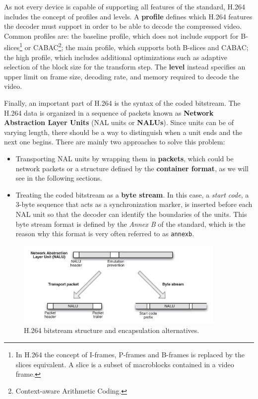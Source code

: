 As not every device is capable of supporting all features of the standard, H.264 includes the concept of profiles and levels. A \textbf{profile} defines which H.264 features the decoder must support in order to be able to decode the compressed video. Common profiles are: the baseline profile, which does not include support for B-slices\footnote{In H.264 the concept of I-frames, P-frames and B-frames is replaced by the slices equivalent. A slice is a subset of macroblocks contained in a video frame.} or CABAC\footnote{Context-aware Arithmetic Coding.}; the main profile, which supports both B-slices and CABAC; the high profile, which includes additional optimizations such as adaptive selection of the block size for the transform step. The \textbf{level} instead specifies an upper limit on frame size, decoding rate, and memory required to decode the video.

Finally, an important part of H.264 is the syntax of the coded bitstream. The H.264 data is organized in a sequence of packets known as \textbf{Network Abstraction Layer Units} (NAL units or \textbf{NALUs}). Since units can be of varying length, there should be a way to distinguish when a unit ends and the next one begins. There are mainly two approaches to solve this problem:

\begin{itemize}
    \item Transporting NAL units by wrapping them in \textbf{packets}, which could be network packets or a structure defined by the \textbf{container format}, as we will see in the following sections.
    \item Treating the coded bitstream as a \textbf{byte stream}. In this case, a \textit{start code}, a 3-byte sequence that acts as a synchronization marker, is inserted before each NAL unit so that the decoder can identify the boundaries of the units. This byte stream format is defined by the \textit{Annex B} of the standard, which is the reason why this format is very often referred to as \texttt{annexb}.
\end{itemize}

\begin{figure}
	\centering
	
	\includegraphics[width=0.9\textwidth]{res/h264_nalu.png}
	
	\caption{H.264 bitstream structure and encapsulation alternatives.}
	\label{fig:h264_scope}
\end{figure}

